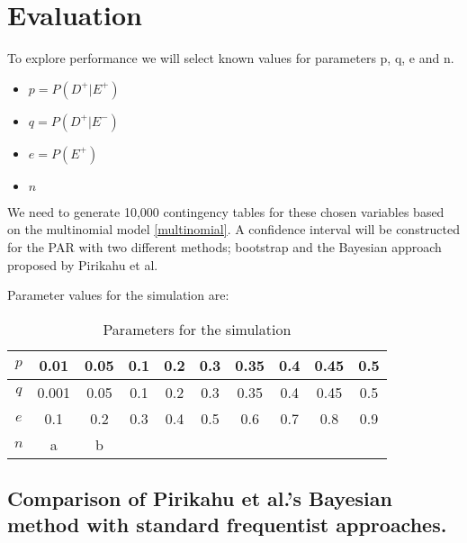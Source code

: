 \chapter{Evaluation} \label{sec:Evaluation}

To explore performance we will select known values for parameters p, q, e and n. 
\begin{itemize}
    \item $p = P(D^+ |E^+)$
    \item $q = P(D^+ |E^-)$
    \item $e = P(E^+)$
    \item $n$
\end{itemize}

We need to generate 10,000 contingency tables for these chosen variables based on the multinomial model \ref{multinomial}. A confidence interval will be constructed for the PAR with two different methods; bootstrap and the Bayesian approach proposed by Pirikahu et al.

Parameter values for the simulation are:
\begin{table}[h!]
    \centering
    \caption{Parameters for the simulation}
    \label{sample-parameters}
    \begin{tabular}{|c|c|c|c|c|c|c|c|c|c|}
    \hline
    $p$ & 0.01 & 0.05 & 0.1 & 0.2 & 0.3 & 0.35 & 0.4 & 0.45 & 0.5 \\ \hline
    $q$ & 0.001 & 0.05 & 0.1 & 0.2 & 0.3 & 0.35 & 0.4 & 0.45 & 0.5 \\ \hline
    $e$ & 0.1 & 0.2 & 0.3 & 0.4 & 0.5 & 0.6 & 0.7 & 0.8 & 0.9 \\ \hline
    $n$ & a & b & &&&&&& \\ \hline
    \end{tabular}
    \end{table}

\section{Comparison of Pirikahu et al.'s Bayesian method with standard frequentist approaches.}
